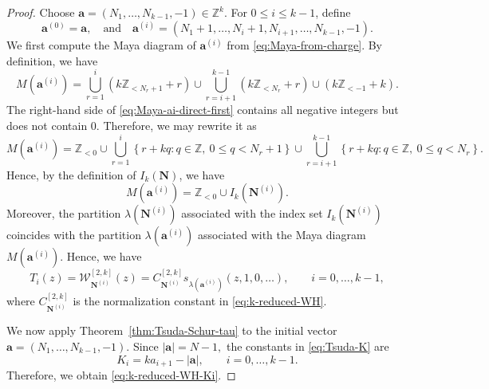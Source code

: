 \documentclass[preprint,3p,10pt]{elsarticle}
\theoremstyle{definition}
\begin{document}
\begin{proof}
Choose $\mathbf a
    =
    (N_1,\ldots,N_{k-1},-1)\in\mathbb Z^k .$
For \(0\le i\le k-1\), define
\begin{equation}
\label{eq:shifted-charge-k-reduced-proof}
    \mathbf a^{(0)}=\mathbf a, \quad \text{and} \quad 
    \mathbf a^{(i)}
    =
    (N_1+1,\ldots,N_i+1,N_{i+1},\ldots,N_{k-1},-1).
\end{equation}
We first compute the Maya diagram of \(\mathbf a^{(i)}\) from
\eqref{eq:Maya-from-charge}.  By definition, we have
\begin{equation}
\label{eq:Maya-ai-direct-first}
    M\left(\mathbf a^{(i)}\right)
    =
    \bigcup_{r=1}^{i}
    \left(k\mathbb Z_{<N_r+1}+r\right)
    \cup
    \bigcup_{r=i+1}^{k-1}
    \left(k\mathbb Z_{<N_r}+r\right)
    \cup
    \left(k\mathbb Z_{<-1}+k\right).
\end{equation}
The right-hand side of \eqref{eq:Maya-ai-direct-first} contains all negative integers but does not contain \(0\). Therefore, we may rewrite it as
\begin{equation}
\label{eq:Maya-ai-direct-second}
    M\left(\mathbf a^{(i)}\right)
    =
    \mathbb Z_{<0}
    \cup
    \bigcup_{r=1}^{i}
    \left\{
        r+kq:
        q\in\mathbb Z,\ 0\le q<N_r+1
    \right\}\cup
    \bigcup_{r=i+1}^{k-1}
    \left\{
        r+kq:
        q\in\mathbb Z,\ 0\le q<N_r
    \right\}.
\end{equation}
Hence, by the definition of \(I_k(\mathbf N)\), we have
\begin{equation}
\label{eq:Maya-ai-block-index}
    M\left(\mathbf a^{(i)}\right)
    =
    \mathbb Z_{<0}
    \cup
    I_k\left(\mathbf N^{(i)}\right).
\end{equation}
Moreover, the partition \(\lambda\left(\mathbf N^{(i)}\right)\) associated with the index set \(I_k\left(\mathbf N^{(i)}\right)\) coincides with the partition \(\lambda\left(\mathbf a^{(i)}\right)\) associated with the Maya diagram \(M\left(\mathbf a^{(i)}\right)\). Hence, we have
\begin{equation}
\label{eq:k-reduced-WH-as-Schur-proof}
    T_i(z)
    =
    \mathcal W_{\mathbf N^{(i)}}^{[2,k]}(z)
    =
    C_{\mathbf N^{(i)}}^{[2,k]}
    s_{\lambda\left(\mathbf a^{(i)}\right)}(z,1,0,\ldots),
    \qquad
    i=0,\ldots,k-1,
\end{equation}
where \(C_{\mathbf N^{(i)}}^{[2,k]}\) is the normalization constant in
\eqref{eq:k-reduced-WH}.

We now apply Theorem~\ref{thm:Tsuda-Schur-tau} to the initial vector $\mathbf a=(N_1,\ldots,N_{k-1},-1).$
Since $|\mathbf a|=N-1,$
the constants in \eqref{eq:Tsuda-K} are
\begin{equation}
    K_i=ka_{i+1}-|\mathbf a|,
    \qquad
    i=0,\ldots,k-1.
\end{equation}
Therefore, we obtain \eqref{eq:k-reduced-WH-Ki}.


\end{proof}
\end{document}
